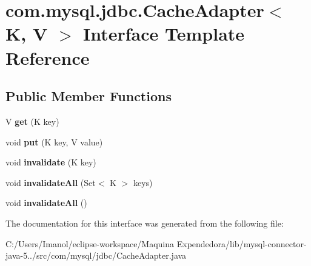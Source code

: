 \hypertarget{interfacecom_1_1mysql_1_1jdbc_1_1_cache_adapter}{}\section{com.\+mysql.\+jdbc.\+Cache\+Adapter$<$ K, V $>$ Interface Template Reference}
\label{interfacecom_1_1mysql_1_1jdbc_1_1_cache_adapter}
\subsection*{Public Member Functions}
\begin{DoxyCompactItemize}
\item 
\mbox{\label{interfacecom_1_1mysql_1_1jdbc_1_1_cache_adapter_a2da479c148127ef9940c7d14bdfd681e}} 
V {\bfseries get} (K key)
\item 
\mbox{\label{interfacecom_1_1mysql_1_1jdbc_1_1_cache_adapter_aadaa86a2e53b6b7599dc548af60c9923}} 
void {\bfseries put} (K key, V value)
\item 
\mbox{\label{interfacecom_1_1mysql_1_1jdbc_1_1_cache_adapter_a40e7e546d6a5509744df90719c209fdd}} 
void {\bfseries invalidate} (K key)
\item 
\mbox{\label{interfacecom_1_1mysql_1_1jdbc_1_1_cache_adapter_abd53078d52aa8e3c042b01d2811db4fa}} 
void {\bfseries invalidate\+All} (Set$<$ K $>$ keys)
\item 
\mbox{\label{interfacecom_1_1mysql_1_1jdbc_1_1_cache_adapter_a45084a21fe32d354d2c5f5ae0fd92ece}} 
void {\bfseries invalidate\+All} ()
\end{DoxyCompactItemize}


The documentation for this interface was generated from the following file\+:\begin{DoxyCompactItemize}
\item 
C\+:/\+Users/\+Imanol/eclipse-\/workspace/\+Maquina Expendedora/lib/mysql-\/connector-\/java-\/5../src/com/mysql/jdbc/Cache\+Adapter.\+java\end{DoxyCompactItemize}
